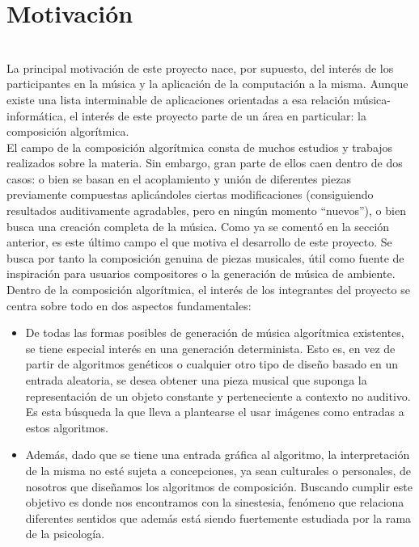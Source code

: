 \section{Motivación}
\label{sec:motivacion}

\\

La principal motivación de este proyecto nace, por supuesto, del interés de los participantes en la música y la aplicación de la computación a la misma. Aunque existe una lista interminable de aplicaciones orientadas a esa relación música-informática, el interés de este proyecto parte de un área en particular: la composición algorítmica.\\

El campo de la composición algorítmica consta de muchos estudios y trabajos realizados sobre la materia. Sin embargo, gran parte de ellos caen dentro de dos casos: o bien se basan en el acoplamiento y unión de diferentes piezas previamente compuestas aplicándoles ciertas modificaciones (consiguiendo resultados auditivamente agradables, pero en ningún momento ``nuevos''), o bien busca una creación completa de la música. Como ya se comentó en la sección anterior, es este último campo el que motiva el desarrollo de este proyecto. Se busca por tanto la composición genuina de piezas musicales, útil como fuente de inspiración para usuarios compositores o la generación de música de ambiente.\\

Dentro de la composición algorítmica, el interés de los integrantes del proyecto se centra sobre todo en dos aspectos fundamentales:

\begin{itemize}

	\item De todas las formas posibles de generación de música algorítmica existentes, se tiene especial interés en una generación determinista. Esto es, en vez de partir de algoritmos genéticos o cualquier otro tipo de diseño basado en un entrada aleatoria, se desea obtener una pieza musical que suponga la representación de un objeto constante y perteneciente a contexto no auditivo. Es esta búsqueda la que lleva a plantearse el usar imágenes como entradas a estos algoritmos.
	
	\item Además, dado que se tiene una entrada gráfica al algoritmo, la interpretación de la misma no esté sujeta a concepciones, ya sean culturales o personales, de nosotros que diseñamos los algoritmos de composición. Buscando cumplir este objetivo es donde nos encontramos con la sinestesia, fenómeno que relaciona diferentes sentidos que además está siendo fuertemente estudiada por la rama de la psicología.
	
\end{itemize}

